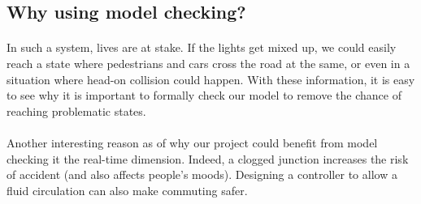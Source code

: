 \documentclass{article}
\begin{document}
\subsection{Why using model checking?}
\paragraph{}
In such a system, lives are at stake. If the lights get mixed up, we could easily reach a state where pedestrians and cars cross the road at the same, or even in a situation where head-on collision could happen. With these information, it is easy to see why it is important to formally check our model to remove the chance of reaching problematic states.
\paragraph{}
Another interesting reason as of why our project could benefit from model checking it the real-time dimension. Indeed, a clogged junction increases the risk of accident (and also affects people's moods). Designing a controller to allow a fluid circulation can also make commuting safer.
\end{document}
